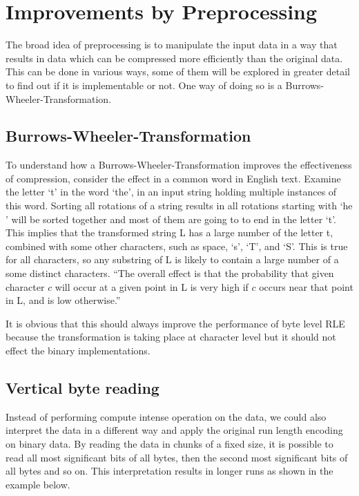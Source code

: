 \section{Improvements by Preprocessing}
\label{ch:Analysis:sec:Improvements by Preprocessing}

The broad idea of preprocessing is to manipulate the input data in a way that results in data which can be compressed more efficiently than the original data. This can be done in various ways, some of them will be explored in greater detail to find out if it is implementable or not. One way of doing so is a Burrows-Wheeler-Transformation.

\subsection{Burrows-Wheeler-Transformation}
\label{ch:Analysis:sec:Improvements by Preprocessing:subSec:bwt}
\par{
To understand how a Burrows-Wheeler-Transformation improves the effectiveness of compression, consider the effect in a common word in English text. Examine the letter ‘t’ in the word ‘the’, in an input string holding multiple instances of this word.
Sorting all rotations of a string results in all rotations starting with ‘he ’ will be sorted together and most of them are going to to end in the letter ‘t’. This implies that the transformed string L has a large number of the letter t, combined with some other characters, such as space, ‘s’, ‘T’, and ‘S’. This is true for all characters, so any substring of L is likely to contain a large number of a some distinct characters. \enquote{The overall effect is that the probability that given character $c$ will occur at a given
point in L is very high if $c$ occurs near that point in L, and is low otherwise.} \cite{Burrows94}
}

\par{
It is obvious that this should always improve the performance of byte level RLE because the transformation is taking place at character level but it should not effect the binary implementations. 
}

\subsection{Vertical byte reading}
\par{
Instead of performing compute intense operation on the data, we could also interpret the data in a different way and apply the original run length encoding on binary data. By reading the data in chunks of a fixed size, it is possible to read all most significant bits of all bytes, then the second most significant bits of all bytes and so on. This interpretation results in longer runs as shown in the example below.
}

